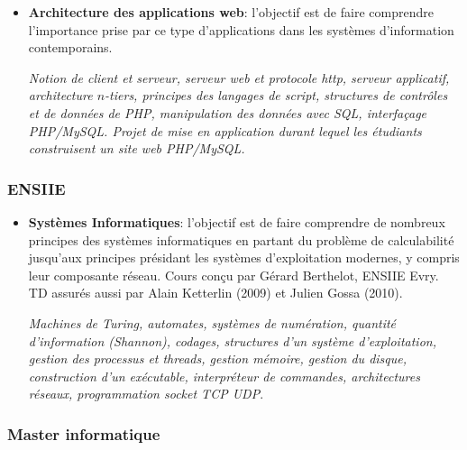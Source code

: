 \documentclass[11pt]{article}
\begin{document}
\begin{itemize}
%
\item \textbf{Architecture des applications web}: l'objectif est de faire comprendre
l'importance prise par ce type d'applications dans les systèmes d'information 
contemporains.  

\textit{Notion de client et serveur, 
serveur web et protocole http, serveur applicatif,
architecture $n$-tiers, principes des langages de script, structures de contrôles et de données de PHP, manipulation
des données avec SQL, interfaçage PHP/MySQL. Projet de mise en application durant lequel les étudiants
construisent un site web PHP/MySQL.}\\


\end{itemize}

\subsubsection*{ENSIIE}

\begin{itemize}
\item \textbf{Systèmes Informatiques}: l'objectif est de faire comprendre de nombreux principes
des systèmes informatiques en partant du problème de calculabilité jusqu'aux principes 
présidant les systèmes d'exploitation modernes, y compris leur composante réseau.
Cours conçu par Gérard Berthelot, ENSIIE Evry. TD assurés aussi par Alain Ketterlin (2009)
et Julien Gossa (2010).

\textit{Machines de Turing, automates, systèmes de numération, 
quantité d'information (Shannon), codages, structures d'un système d'exploitation,
gestion des processus et threads, gestion mémoire, gestion du disque, 
construction d'un exécutable, interpréteur de commandes, architectures réseaux, programmation socket TCP UDP}.
\end{itemize}


\subsubsection*{Master informatique}
\end{document}
